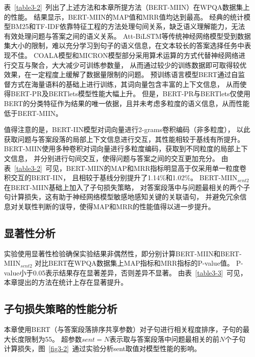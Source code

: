 表~\ref{table3-2}~列出了上述方法和本章所提方法（BERT-MIIN）在WPQA数据集上的性能。
结果显示，BERT-MIIN的MAP值和MRR值均达到最高。
经典的统计模型BM25和TF-IDF依靠特征工程的方法处理句间关系，缺乏语义理解能力，无法有效处理问题与答案之间的语义关系。
Att-BiLSTM等传统神经网络模型受到数据集大小的限制，难以充分学习到句子的语义信息，在文本较长的答案选择任务中表现不佳。
COALA模型和MICRON模型部分采用算术运算的方式代替神经网络进行交互与聚合，大大减少可训练参数量，
从而通过较少的训练数据即可取得较优效果，在一定程度上缓解了数据量限制的问题。
预训练语言模型BERT通过自监督方式在海量语料的基础上进行训练，其词向量包含丰富的上下文信息，
从而使得BERT-PR及BERTlets模型性能大幅上升。
但是，BERT-PR与BERTlets仅使用BERT的分类特征作为结果的唯一依据，且并未考虑多粒度的语义信息，从而性能低于BERT-MIIN。



值得注意的是，BERT-IIN模型对词向量进行2-grams卷积编码（非多粒度），
以此获取问题与答案段落的局部上下文信息进行交互，其性能相较于基线有所提升。
BERT-MIIN使用多种卷积对词向量进行多粒度编码，获取到不同粒度的局部上下文信息，
并分别进行句间交互，使得问题与答案之间的交互更加充分。
由表~\ref{table3-2}~可见，BERT-MIIN的MAP和MRR指标明显高于仅采用单一粒度卷积交互的BERT-IIN，
且相较于基线分别提升了1.14\%和1.02\%。
BERT-MIIN$_{sent2}$在BERT-MIIN基础上加入了子句损失策略，
对答案段落中与问题最相关的两个子句计算损失，这有助于神经网络模型敏感地感知关键的关联语句，
并避免冗余信息对关联性判断的误导，使得MAP和MRR的性能值得以进一步提升。



\subsection{显著性分析}

实验使用显著性检验确保实验结果非偶然性，即分别计算BERT-MIIN和BERT-MIIN$_{sent2}$
对比BERT在WPQA数据集上MAP指标和MRR指标的P-value值。
P-value小于0.05表示结果存在显著差异，否则差异不显著。
由表~\ref{table3-3}~可见，本章提出的方法在统计上存在显著提升。



\subsection{子句损失策略的性能分析}

本章使用BERT（与答案段落排序共享参数）对子句进行相关程度排序，子句的最大长度限制为55。
超参数$sent=N$表示取与答案段落中问题最相关的前$N$个子句计算损失，图~\ref{fig3-2}~通过实验分析sent取值对模型性能的影响。

